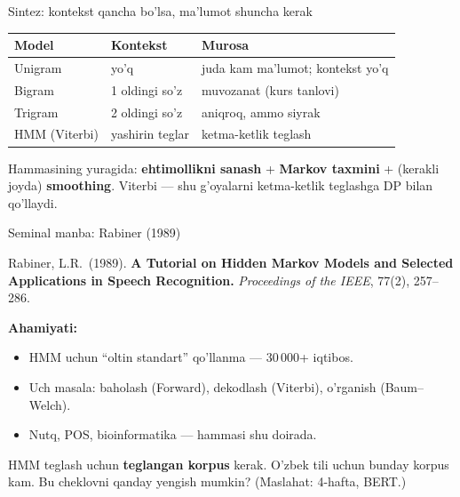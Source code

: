 \documentclass[aspectratio=169,11pt]{beamer}
\begin{document}
\begin{frame}{Sintez: kontekst qancha bo'lsa, ma'lumot shuncha kerak}
  \begin{center}\small
  \begin{tabular}{p{2.6cm}p{3.4cm}p{4.4cm}}
    \toprule
    \textbf{Model} & \textbf{Kontekst} & \textbf{Murosa} \\
    \midrule
    Unigram & yo'q & juda kam ma'lumot; kontekst yo'q \\
    Bigram & 1 oldingi so'z & muvozanat (kurs tanlovi) \\
    Trigram & 2 oldingi so'z & aniqroq, ammo siyrak \\
    HMM (Viterbi) & yashirin teglar & ketma-ketlik teglash \\
    \bottomrule
  \end{tabular}
  \end{center}
  \vspace{4pt}
  \begin{tcolorbox}[okbox,title=Asosiy g'oya,top=2pt,bottom=2pt]
    \footnotesize
    Hammasining yuragida: \textbf{ehtimollikni sanash} + \textbf{Markov taxmini}
    + (kerakli joyda) \textbf{smoothing}. Viterbi --- shu g'oyalarni
    ketma-ketlik teglashga DP bilan qo'llaydi.
  \end{tcolorbox}
\end{frame}

\begin{frame}{Seminal manba: Rabiner (1989)}
  \begin{tcolorbox}[defbox,title=Manba]
    \small
    Rabiner, L.R.\ (1989). \textbf{A Tutorial on Hidden Markov Models and
    Selected Applications in Speech Recognition.} \textit{Proceedings of the
    IEEE}, 77(2), 257--286.
  \end{tcolorbox}
  \vspace{5pt}
  \textbf{Ahamiyati:}
  \begin{itemize}\small\setlength\itemsep{3pt}
    \item HMM uchun ``oltin standart'' qo'llanma --- 30\,000+ iqtibos.
    \item Uch masala: baholash (Forward), dekodlash (Viterbi), o'rganish (Baum--Welch).
    \item Nutq, POS, bioinformatika --- hammasi shu doirada.
  \end{itemize}
  \vspace{5pt}
  \begin{tcolorbox}[warnbox,title=Muhokama savoli (P5 gacha o'ylang)]
    \small
    HMM teglash uchun \textbf{teglangan korpus} kerak. O'zbek tili uchun bunday
    korpus kam. Bu cheklovni qanday yengish mumkin? (Maslahat: 4-hafta, BERT.)
  \end{tcolorbox}
\end{frame}
\end{document}
